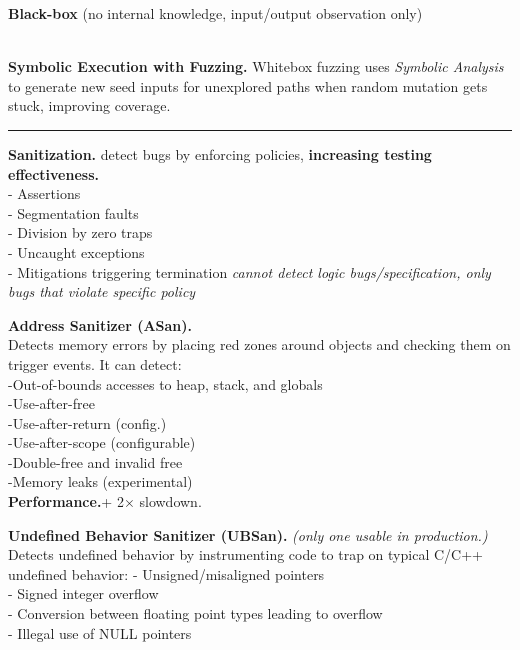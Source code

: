 \documentclass[9pt, a4paper]{extarticle}
\makeatletter
\renewcommand{\hline}{\noalign{\vskip 2px}\hrule\@height\arrayrulewidth\@width\linewidth\noalign{\vskip 2px}}
\makeatother
\begin{document}
\begin{minipage}[t]{0.5\textwidth}
\begin{minipage}[t]{0.495\textwidth}
		\textbf{Black-box} (no internal knowledge, input/output observation only)
	\end{minipage}\\
	\textbf{Symbolic Execution with Fuzzing.} Whitebox fuzzing uses \textit{Symbolic Analysis} to generate new seed inputs for unexplored paths when random mutation gets stuck, improving coverage.
	\hline
	\begin{minipage}[t]{0.27\textwidth}
		\scriptsize
		\textbf{Sanitization.} detect bugs by enforcing policies, \textbf{increasing testing effectiveness.}\\
		- Assertions\\
		- Segmentation faults\\
		- Division by zero traps\\
		- Uncaught exceptions\\
		- Mitigations triggering termination
		\textit{cannot detect logic bugs/specification, only bugs that violate specific policy}
	\end{minipage}\hfill\vline\hfill
	\begin{minipage}[t]{0.32\textwidth}
		\scriptsize
		\textbf{Address Sanitizer (ASan).}\\
		Detects memory errors by placing red zones around objects and checking them on trigger events. It can detect:\\
		-Out-of-bounds accesses to heap, stack, and globals\\
		-Use-after-free\\
		-Use-after-return (config.)\\
		-Use-after-scope (configurable)\\
		-Double-free and invalid free\\
		-Memory leaks (experimental)\\
		\textbf{Performance.}+ 2$\times$ slowdown.
	\end{minipage}\hfill\vline\hfill
	\begin{minipage}[t]{0.38\textwidth}
		\scriptsize
		\textbf{Undefined Behavior Sanitizer (UBSan).} \textit{(only one usable in production.)}\\Detects undefined behavior by instrumenting code to trap on typical C/C++ undefined behavior:
		- Unsigned/misaligned pointers\\
		- Signed integer overflow\\
		- Conversion between floating point types leading to overflow\\
		- Illegal use of NULL pointers\\

\end{minipage}
\end{minipage}
\end{document}
